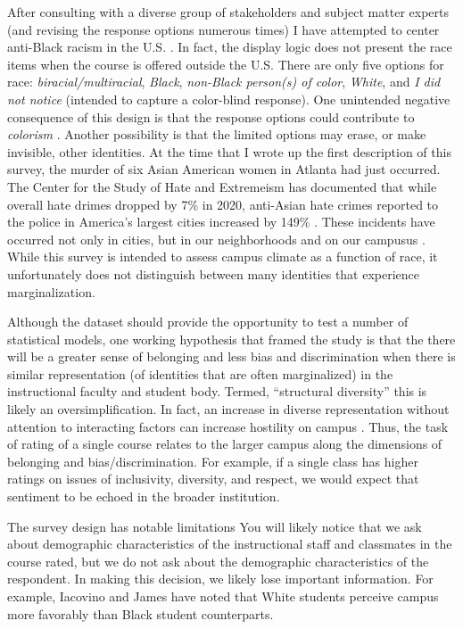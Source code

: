 \documentclass[
  english,
]{book}
\begin{document}
After consulting with a diverse group of stakeholders and subject matter experts (and revising the response options numerous times) I have attempted to center anti-Black racism in the U.S. \citep{mosley_critical_2021, mosley_radical_2020, singh_building_2020}. In fact, the display logic does not present the race items when the course is offered outside the U.S. There are only five options for race: \emph{biracial/multiracial}, \emph{Black}, \emph{non-Black person(s) of color}, \emph{White}, and \emph{I did not notice} (intended to capture a color-blind response). One unintended negative consequence of this design is that the response options could contribute to \emph{colorism} \citep{adames_fallacy_2021, capielo_rosario_acculturation_2019}. Another possibility is that the limited options may erase, or make invisible, other identities. At the time that I wrote up the first description of this survey, the murder of six Asian American women in Atlanta had just occurred. The Center for the Study of Hate and Extremeism has documented that while overall hate drimes dropped by 7\% in 2020, anti-Asian hate crimes reported to the police in America's largest cities increased by 149\% \citep{noauthor_fact_nodate}. These incidents have occurred not only in cities, but in our neighborhoods and on our campusus \citep{kim_guest_2021, kim_yes_2021, noauthor_stop_nodate}. While this survey is intended to assess campus climate as a function of race, it unfortunately does not distinguish between many identities that experience marginalization.

Although the dataset should provide the opportunity to test a number of statistical models, one working hypothesis that framed the study is that the there will be a greater sense of belonging and less bias and discrimination when there is similar representation (of identities that are often marginalized) in the instructional faculty and student body. Termed, ``structural diversity'' \citep{lewis_black_2019} this is likely an oversimplification. In fact, an increase in diverse representation without attention to interacting factors can increase hostility on campus \citep{hurtado_linking_2007}. Thus, the task of rating of a single course relates to the larger campus along the dimensions of belonging and bias/discrimination. For example, if a single class has higher ratings on issues of inclusivity, diversity, and respect, we would expect that sentiment to be echoed in the broader institution.

The survey design has notable limitations You will likely notice that we ask about demographic characteristics of the instructional staff and classmates in the course rated, but we do not ask about the demographic characteristics of the respondent. In making this decision, we likely lose important information. For example, Iacovino and James \citeyearpar{iacovino_retaining_2016} have noted that White students perceive campus more favorably than Black student counterparts.
\end{document}
